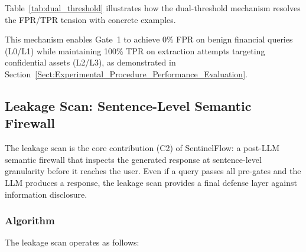 \documentclass[journal]{IEEEtran}
\begin{document}
Table~\ref{tab:dual_threshold} illustrates how the dual-threshold mechanism resolves the FPR/TPR tension with concrete examples.

\begin{table}[!ht]
    \centering
    \caption{Dual-Threshold Mechanism: Example Decisions}
    \label{tab:dual_threshold}
\end{table}

This mechanism enables Gate~1 to achieve 0\% FPR on benign financial queries (L0/L1) while maintaining 100\% TPR on extraction attempts targeting confidential assets (L2/L3), as demonstrated in Section~\ref{Sect:Experimental_Procedure_Performance_Evaluation}.

\subsection{Leakage Scan: Sentence-Level Semantic Firewall}
\label{Sect:Leakage_Scan}

The leakage scan is the core contribution (C2) of SentinelFlow: a post-LLM semantic firewall that inspects the generated response at sentence-level granularity before it reaches the user. Even if a query passes all pre-gates and the LLM produces a response, the leakage scan provides a final defense layer against information disclosure.

\subsubsection{Algorithm}

The leakage scan operates as follows:
\end{document}
